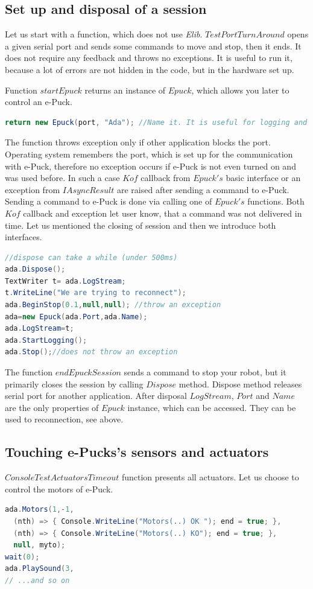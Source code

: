 \subsection{Set up and disposal of a session}\label{sec:session}
  Let us start with a function, which does not use {\it Elib}. $TestPortTurnAround$ opens a given serial port
  and sends some commands to move and stop, then it ends. It does not require any feedback and throws no exceptions.
  It is useful to run it, because a lot of errors are not hidden in the code, but in the hardware set up.

  Function $startEpuck$ returns an instance of $Epuck$, which allows you later to control an e-Puck.
\begin{lstlisting}[language=cs]
return new Epuck(port, "Ada"); //Name it. It is useful for logging and debugging.
\end{lstlisting}
  The function throws exception only if other application blocks the port. 
  Operating system remembers
  the port, which is set up for the communication with e-Puck, therefore
  no exception occurs if e-Puck is not even turned on and was used before.
  In such a case $Kof$ callback from $Epuck's$ basic interface or an exception	
  from $IAsyncResult$ are raised after sending a command to e-Puck.
  Sending a command to e-Puck is done via calling one of $Epuck's$ functions.
  Both $Kof$ callback and exception let user know, that a command was not delivered in time.
  Let us mentioned the closing of session and then we introduce both interfaces.
\begin{lstlisting}[language=cs]
//dispose can take a while (under 500ms)
ada.Dispose();
TextWriter t= ada.LogStream;
t.WriteLine("We are trying to reconnect");
ada.BeginStop(0.1,null,null); //throw an exception
ada=new Epuck(ada.Port,ada.Name);
ada.LogStream=t;
ada.StartLogging();
ada.Stop();//does not throw an exception
\end{lstlisting}
  The function $endEpuckSession$ sends a command to stop your robot, 
  but it primarily closes the session by calling $Dispose$ method.
  Dispose method releases serial port for another application. 
  After disposal $LogStream$, $Port$ and $Name$ are the 
  only properties of $Epuck$ instance, which can be accessed. 
  They can be used to reconnection, see above.

\subsection{Touching e-Pucks's sensors and actuators}\label{sec:touching}
  $ConsoleTestActuatorsTimeout$ function presents all actuators. Let us choose to control the motors of e-Puck.
\begin{lstlisting}[language=cs]
ada.Motors(1,-1,
  (nth) => { Console.WriteLine("Motors(..) OK "); end = true; },
  (nth) => { Console.WriteLine("Motors(..) KO"); end = true; },
  null, myto);
wait(0);
ada.PlaySound(3,
// ...and so on
\end{lstlisting}
  
